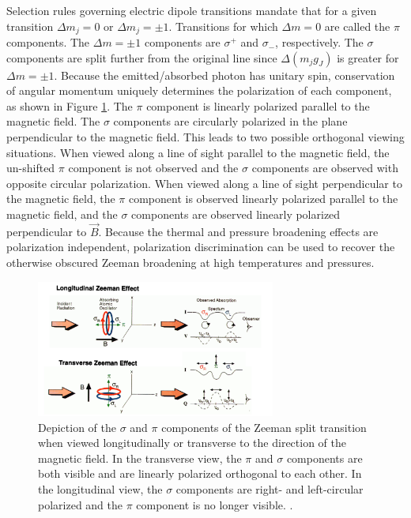 \documentclass{jpp}
\begin{document}
Selection rules governing electric dipole transitions mandate that for a given transition $\Delta m_j = 0$ or $\Delta m_j = \pm 1$. Transitions for which $\Delta m = 0$ are called the $\pi$ components. The $\Delta m = \pm 1$ components are $\sigma^+$ and $\sigma _-$, respectively. The $\sigma$ components are split further from the original line since $\Delta (m_j g_J)$ is greater for $\Delta m = \pm 1$. Because the emitted/absorbed photon has unitary spin, conservation of angular momentum uniquely determines the polarization of each component, as shown in Figure \ref{fig:zeeman-polarization}. The $\pi$ component is linearly polarized parallel to the magnetic field. The $\sigma$ components are circularly polarized in the plane perpendicular to the magnetic field. This leads to two possible orthogonal viewing situations. When viewed along a line of sight parallel to the magnetic field, the un-shifted $\pi$ component is not observed and the $\sigma$ components are observed with opposite circular polarization. When viewed along a line of sight perpendicular to the magnetic field, the $\pi$ component is observed linearly polarized parallel to the magnetic field, and the $\sigma$ components are observed linearly polarized perpendicular to $\vec B$. Because the thermal and pressure broadening effects are polarization independent, polarization discrimination can be used to recover the otherwise obscured Zeeman broadening at high temperatures and pressures.

\begin{figure}
  \centering
  \includegraphics[width=0.7\textwidth]{pres4cropped.png}
  \caption{Depiction of the $\sigma$ and $\pi$ components of the Zeeman split transition when viewed longitudinally or transverse to the direction of the magnetic field. In the transverse view, the $\pi$ and $\sigma$ components are both visible and are linearly polarized orthogonal to each other. In the longitudinal view, the $\sigma$ components are right- and left-circular polarized and the $\pi$ component is no longer visible. \citep{https://doi.org/10.1029/1999RG900011}.}
\label{fig:zeeman-polarization}
\end{figure}
\end{document}
